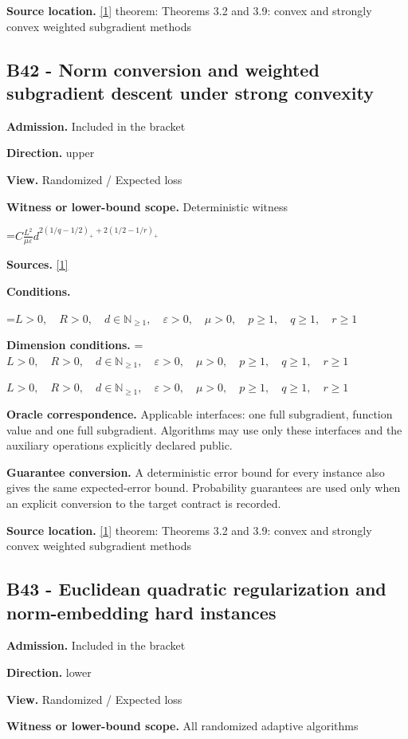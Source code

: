 \documentclass[10pt,a4paper]{article}
\newcommand{\AtlasMath}[1]{\par\begingroup\centering\setbox0=\hbox{$\displaystyle #1$}\ifdim\wd0>1.4\linewidth\typeout{ATLAS WIDE FORMULA: \the\wd0}\fi\ifdim\wd0>\linewidth\resizebox{\linewidth}{!}{\box0}\else\box0\fi\par\endgroup}
\newcommand{\AtlasInlineMath}[1]{\begingroup\setbox0=\hbox{$#1$}\ifdim\wd0>.4\linewidth\endgroup\AtlasMath{#1}\else\endgroup$#1$\fi}
\begin{document}
\textbf{Source location.} \href{https://arxiv.org/pdf/1405.4980}{[1]} theorem: Theorems 3.2 and 3.9: convex and strongly convex weighted subgradient methods

\subsection{B42 - Norm conversion and weighted subgradient descent under strong convexity}
\textbf{Admission.} Included in the bracket

\textbf{Direction.} upper

\textbf{View.} Randomized / Expected loss

\textbf{Witness or lower-bound scope.} Deterministic witness

\AtlasMath{C\frac{L^2}{\mu\varepsilon}d^{2(1/q-1/2)_++2(1/2-1/r)_+}}
\textbf{Sources.} \href{https://arxiv.org/pdf/1405.4980}{[1]}

\textbf{Conditions.} 
\AtlasMath{L>0,\quad R>0,\quad d\in\mathbb{N}_{\ge1},\quad \varepsilon>0,\quad \mu>0,\quad p\ge1,\quad q\ge1,\quad r\ge1}


\textbf{Dimension conditions.} \AtlasInlineMath{L>0,\quad R>0,\quad d\in\mathbb{N}_{\ge1},\quad \varepsilon>0,\quad \mu>0,\quad p\ge1,\quad q\ge1,\quad r\ge1}

\textbf{Oracle correspondence.} Applicable interfaces: one full subgradient, function value and one full subgradient. Algorithms may use only these interfaces and the auxiliary operations explicitly declared public.

\textbf{Guarantee conversion.} A deterministic error bound for every instance also gives the same expected-error bound. Probability guarantees are used only when an explicit conversion to the target contract is recorded.

\textbf{Source location.} \href{https://arxiv.org/pdf/1405.4980}{[1]} theorem: Theorems 3.2 and 3.9: convex and strongly convex weighted subgradient methods

\subsection{B43 - Euclidean quadratic regularization and norm-embedding hard instances}
\textbf{Admission.} Included in the bracket

\textbf{Direction.} lower

\textbf{View.} Randomized / Expected loss

\textbf{Witness or lower-bound scope.} All randomized adaptive algorithms
\end{document}
